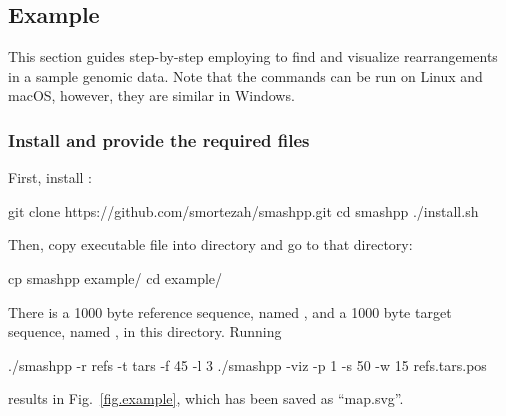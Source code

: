 \documentclass[a4paper,9pt]{extarticle}
\begin{document}



\subsection{Example}
This section guides step-by-step employing \smashpp to find and visualize rearrangements in a sample genomic data. Note that the commands can be run on Linux and macOS, however, they are similar in Windows.

\subsubsection*{Install \smashpp and provide the required files}
First, install \smashpp:
\begin{code}[style=bash]
git clone https://github.com/smortezah/smashpp.git
cd smashpp
./install.sh
\end{code}
Then, copy  executable file into  directory and go to that directory:
\begin{code}[style=bash]
cp smashpp example/
cd example/
\end{code}
There is a 1000 byte reference sequence, named , and a 1000 byte target sequence, named , in this directory. Running
\begin{code}[style=bash]
./smashpp -r refs -t tars -f 45 -l 3
./smashpp -viz -p 1 -s 50 -w 15 refs.tars.pos
\end{code}
results in Fig.~\ref{fig.example}, which has been saved as ``map.svg''.
\end{document}
